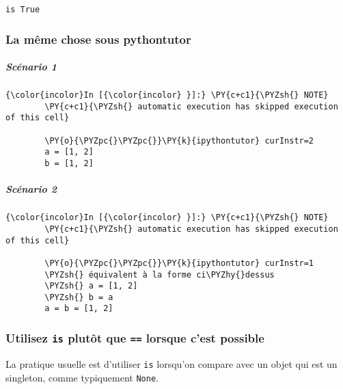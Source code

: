     \begin{Verbatim}[commandchars=\\\{\}]
is True

    \end{Verbatim}

    \hypertarget{la-muxeame-chose-sous-pythontutor}{%
\subsubsection{La même chose sous
pythontutor}\label{la-muxeame-chose-sous-pythontutor}}

    \hypertarget{scuxe9nario-1}{%
\subparagraph{Scénario 1}\label{scuxe9nario-1}}

    \begin{Verbatim}[commandchars=\\\{\}]
{\color{incolor}In [{\color{incolor} }]:} \PY{c+c1}{\PYZsh{} NOTE}
        \PY{c+c1}{\PYZsh{} automatic execution has skipped execution of this cell}
        
        \PY{o}{\PYZpc{}\PYZpc{}}\PY{k}{ipythontutor} curInstr=2
        a = [1, 2]
        b = [1, 2]
\end{Verbatim}


    \hypertarget{scuxe9nario-2}{%
\subparagraph{Scénario 2}\label{scuxe9nario-2}}

    \begin{Verbatim}[commandchars=\\\{\}]
{\color{incolor}In [{\color{incolor} }]:} \PY{c+c1}{\PYZsh{} NOTE}
        \PY{c+c1}{\PYZsh{} automatic execution has skipped execution of this cell}
        
        \PY{o}{\PYZpc{}\PYZpc{}}\PY{k}{ipythontutor} curInstr=1
        \PYZsh{} équivalent à la forme ci\PYZhy{}dessus
        \PYZsh{} a = [1, 2]
        \PYZsh{} b = a
        a = b = [1, 2]
\end{Verbatim}


    \hypertarget{utilisez-is-plutuxf4t-que-lorsque-cest-possible}{%
\subsubsection{\texorpdfstring{Utilisez \texttt{is} plutôt que
\texttt{==} lorsque c'est
possible}{Utilisez is plutôt que == lorsque c'est possible}}\label{utilisez-is-plutuxf4t-que-lorsque-cest-possible}}

    La pratique usuelle est d'utiliser \texttt{is} lorsqu'on compare avec un
objet qui est un singleton, comme typiquement \texttt{None}.

